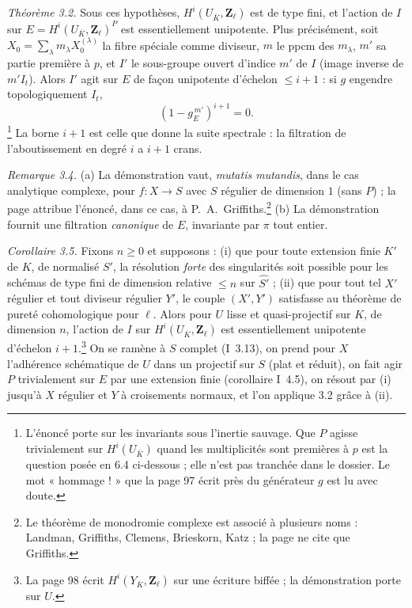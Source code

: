\documentclass[11pt,a4paper]{article}
\begin{document}
\emph{Théorème 3.2.} Sous ces hypothèses, $H^i(U_{\overline K}, \mathbf{Z}_\ell)$
est de type fini, et l'action de $I$ sur $E = H^i(U_{\overline K},
\mathbf{Z}_\ell)^P$ est essentiellement unipotente. Plus précisément, soit
$X_0 = \sum_\lambda m_\lambda X_0^{(\lambda)}$ la fibre spéciale comme diviseur,
$m$ le ppcm des $m_\lambda$, $m'$ sa partie première à $p$, et $I'$ le
sous-groupe ouvert d'indice $m'$ de $I$ (image inverse de $m'I_t$). Alors $I'$
agit sur $E$ de façon unipotente d'échelon $\leq i+1$ : si $g$ engendre
topologiquement $I_t$,
\[
  (1 - g_E^{\,m'})^{i+1} = 0 . \tag{3.3}
\]
\footnote{L'énoncé porte sur les invariants sous l'inertie sauvage. Que $P$
agisse trivialement sur $H^i(U_{\overline K})$ quand les multiplicités sont
premières à $p$ est la question posée en 6.4 ci-dessous ; elle n'est pas
tranchée dans le dossier. Le mot « hommage ! » que la page 97 écrit près du
générateur $g$ est lu avec doute.} La borne $i+1$ est celle que donne la suite
spectrale : la filtration de l'aboutissement en degré $i$ a $i+1$ crans.

\emph{Remarque 3.4.} (a) La démonstration vaut, \emph{mutatis mutandis}, dans le
cas analytique complexe, pour $f : X \to S$ avec $S$ régulier de dimension $1$
(sans $P$) ; la page attribue l'énoncé, dans ce cas, à P.\ A.\
Griffiths.\footnote{Le théorème de monodromie complexe est associé à plusieurs
noms : Landman, Griffiths, Clemens, Brieskorn, Katz ; la page ne cite que
Griffiths.} (b) La démonstration fournit une filtration \emph{canonique} de $E$,
invariante par $\pi$ tout entier.

\emph{Corollaire 3.5.} Fixons $n \geq 0$ et supposons : (i) que pour toute
extension finie $K'$ de $K$, de normalisé $S'$, la résolution \emph{forte} des
singularités soit possible pour les schémas de type fini de dimension relative
$\leq n$ sur $\widehat{S'}$ ; (ii) que pour tout tel $X'$ régulier et tout
diviseur régulier $Y'$, le couple $(X', Y')$ satisfasse au théorème de pureté
cohomologique pour $\ell$. Alors pour $U$ lisse et quasi-projectif sur $K$, de
dimension $n$, l'action de $I$ sur $H^i(U_{\overline K}, \mathbf{Z}_\ell)$ est
essentiellement unipotente d'échelon $i+1$.\footnote{La page 98 écrit
$H^i(Y_{\overline K}, \mathbf{Z}_\ell)$ sur une écriture biffée ; la
démonstration porte sur $U$.} On se ramène à $S$ complet (I~3.13), on prend pour
$X$ l'adhérence schématique de $U$ dans un projectif sur $S$ (plat et réduit),
on fait agir $P$ trivialement sur $E$ par une extension finie
(corollaire I~4.5), on résout par (i) jusqu'à $X$ régulier et $Y$ à croisements
normaux, et l'on applique 3.2 grâce à (ii).
\end{document}
